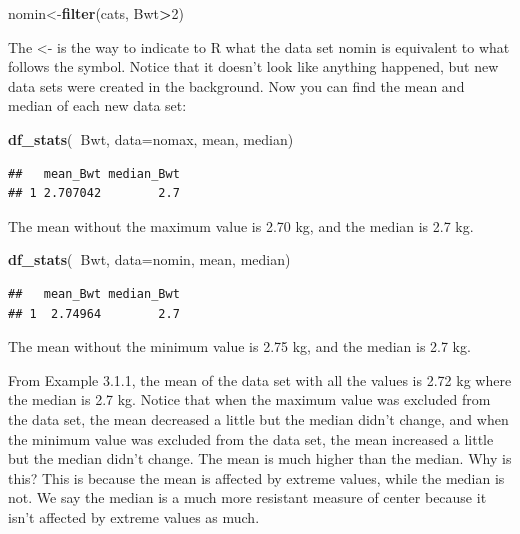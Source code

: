 \documentclass[]{book}
\newenvironment{Shaded}{\begin{snugshade}}{\end{snugshade}}
\newcommand{\DataTypeTok}[1]{\textcolor[rgb]{0.13,0.29,0.53}{#1}}
\newcommand{\DecValTok}[1]{\textcolor[rgb]{0.00,0.00,0.81}{#1}}
\newcommand{\KeywordTok}[1]{\textcolor[rgb]{0.13,0.29,0.53}{\textbf{#1}}}
\newcommand{\NormalTok}[1]{#1}
\newcommand{\OperatorTok}[1]{\textcolor[rgb]{0.81,0.36,0.00}{\textbf{#1}}}
\begin{document}
\begin{Shaded}
\begin{Highlighting}[]
\NormalTok{nomin<-}\KeywordTok{filter}\NormalTok{(cats, Bwt}\OperatorTok{>}\DecValTok{2}\NormalTok{)}
\end{Highlighting}
\end{Shaded}

The \textless{}- is the way to indicate to R what the data set nomin is equivalent to what follows the symbol. Notice that it doesn't look like anything happened, but new data sets were created in the background. Now you can find the mean and median of each new data set:

\begin{Shaded}
\begin{Highlighting}[]
\KeywordTok{df_stats}\NormalTok{(}\OperatorTok{~}\NormalTok{Bwt, }\DataTypeTok{data=}\NormalTok{nomax, mean, median)}
\end{Highlighting}
\end{Shaded}

\begin{verbatim}
##   mean_Bwt median_Bwt
## 1 2.707042        2.7
\end{verbatim}

The mean without the maximum value is 2.70 kg, and the median is 2.7 kg.

\begin{Shaded}
\begin{Highlighting}[]
\KeywordTok{df_stats}\NormalTok{(}\OperatorTok{~}\NormalTok{Bwt, }\DataTypeTok{data=}\NormalTok{nomin, mean, median)}
\end{Highlighting}
\end{Shaded}

\begin{verbatim}
##   mean_Bwt median_Bwt
## 1  2.74964        2.7
\end{verbatim}

The mean without the minimum value is 2.75 kg, and the median is 2.7 kg.

From Example 3.1.1, the mean of the data set with all the values is 2.72 kg where the median is 2.7 kg. Notice that when the maximum value was excluded from the data set, the mean decreased a little but the median didn't change, and when the minimum value was excluded from the data set, the mean increased a little but the median didn't change. The mean is much higher than the median. Why is this? This is because the mean is affected by extreme values, while the median is not. We say the median is a much more resistant measure of center because it isn't affected by extreme values as much.
\end{document}
